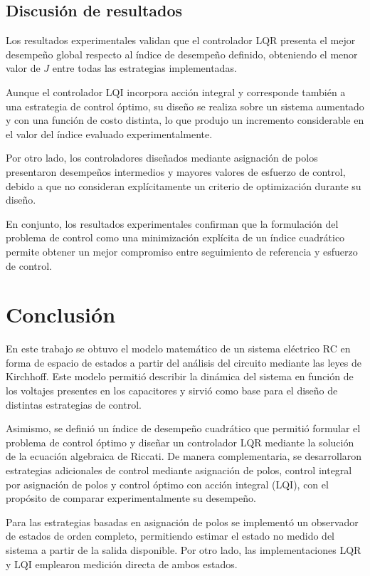 \documentclass[12pt,letterpaper,twoside]{article}
\begin{document}
\subsection{Discusión de resultados}

Los resultados experimentales validan que el controlador LQR presenta el mejor desempeño global respecto al índice de desempeño definido, obteniendo el menor valor de \(J\) entre todas las estrategias implementadas.

Aunque el controlador LQI incorpora acción integral y corresponde también a una estrategia de control óptimo, su diseño se realiza sobre un sistema aumentado y con una función de costo distinta, lo que produjo un incremento considerable en el valor del índice evaluado experimentalmente.

Por otro lado, los controladores diseñados mediante asignación de polos presentaron desempeños intermedios y mayores valores de esfuerzo de control, debido a que no consideran explícitamente un criterio de optimización durante su diseño.

En conjunto, los resultados experimentales confirman que la formulación del problema de control como una minimización explícita de un índice cuadrático permite obtener un mejor compromiso entre seguimiento de referencia y esfuerzo de control.

\section{Conclusión}

En este trabajo se obtuvo el modelo matemático de un sistema eléctrico RC en forma de espacio de estados a partir del análisis del circuito mediante las leyes de Kirchhoff. Este modelo permitió describir la dinámica del sistema en función de los voltajes presentes en los capacitores y sirvió como base para el diseño de distintas estrategias de control.

Asimismo, se definió un índice de desempeño cuadrático que permitió formular el problema de control óptimo y diseñar un controlador LQR mediante la solución de la ecuación algebraica de Riccati. De manera complementaria, se desarrollaron estrategias adicionales de control mediante asignación de polos, control integral por asignación de polos y control óptimo con acción integral (LQI), con el propósito de comparar experimentalmente su desempeño.

Para las estrategias basadas en asignación de polos se implementó un observador de estados de orden completo, permitiendo estimar el estado no medido del sistema a partir de la salida disponible. Por otro lado, las implementaciones LQR y LQI emplearon medición directa de ambos estados.
\end{document}
